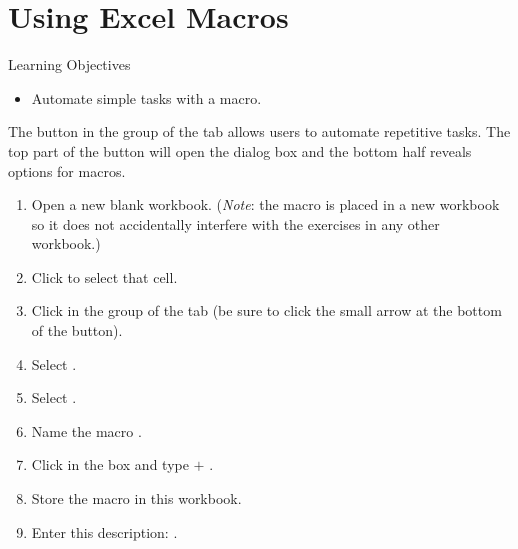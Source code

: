 \section{Using Excel Macros}

\begin{center}
	\begin{objbox}{Learning Objectives}
		\begin{itemize}
			\setlength{\itemsep}{0pt}
			\setlength{\parskip}{0pt}
			\setlength{\parsep}{0pt}
			
			\item Automate simple tasks with a macro.
			
		\end{itemize}
	\end{objbox}
\end{center}

The  button in the  group of the  tab allows users to automate repetitive tasks. The top part of the button will open the  dialog box and the bottom half reveals options for macros. 

\begin{enumerate}
	\item Open a new blank workbook. (\textit{Note}: the macro is placed in a new workbook so it does not accidentally interfere with the exercises in any other workbook.)
	\item Click  to select that cell.
	\item Click  in the  group of the  tab (be sure to click the small arrow at the bottom of the  button).
	\item Select .
	\item Select .
	\item Name the macro .
	\item Click in the  box and type  $ + $ .
	\item Store the macro in this workbook.
	\item Enter this description: .
\end{enumerate}

